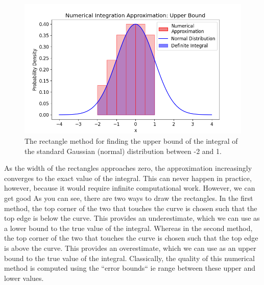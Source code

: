 \documentclass[12pt]{article}
\newcommand{\ndiFigCaption}[1]{The rectangle method for finding the #1 bound of the integral of the standard Gaussian (normal) distribution between -2 and 1.}
\begin{document}
    \FloatBarrier

    \begin{figure}[htbp]
        \centering
        \includegraphics[width=0.8\linewidth]{figures/ndi-num2/ndi-num2_}
        \caption{\ndiFigCaption{upper}}
        \label{fig:ndi-num2_}
    \end{figure}
    As the width of the rectangles approaches zero, the approximation increasingly converges to the exact value of the integral.
    This can never happen in practice, however, because it would require infinite computational work.
    However, we can get good
    As you can see, there are two ways to draw the rectangles.
    In the first method, the top corner of the two that touches the curve is chosen such that the top edge is below the curve.
    This provides an underestimate, which we can use as a lower bound to the true value of the integral.
    Whereas in the second method, the top corner of the two that touches the curve is chosen such that the top edge is above the curve.
    This provides an overestimate, which we can use as an upper bound to the true value of the integral.
    Classically, the quality of this numerical method is computed using the ``error bounds`` ie range between these upper and lower values.
\end{document}
